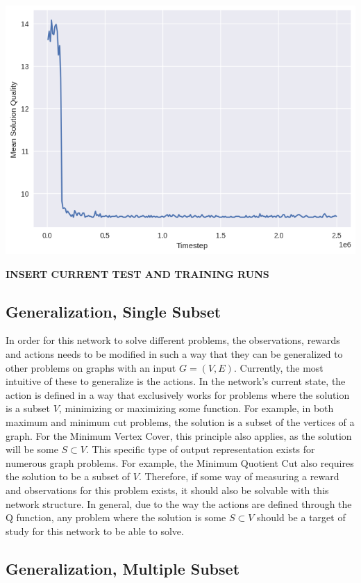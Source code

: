 \documentclass{article}
\begin{document}
\includegraphics[scale=0.5]{../ER_20spin/eco/min_cover/network/training_curve.png}

\textbf{INSERT CURRENT TEST AND TRAINING RUNS}

\subsection{Generalization, Single Subset}

In order for this network to solve different problems, the observations, rewards and actions needs to be modified in such a way that they can be generalized to other problems on graphs with an input $G = (V, E)$. Currently, the most intuitive of these to generalize is the actions. In the network's current state, the action is defined in a way that exclusively works for problems where the solution is a subset $V$, minimizing or maximizing some function. For example, in both maximum and minimum cut problems, the solution is a subset of the vertices of a graph. For the Minimum Vertex Cover, this principle also applies, as the solution will be some $S \subset V$. This specific type of output representation exists for numerous graph problems. For example, the Minimum Quotient Cut also requires the solution to be a subset of $V$. Therefore, if some way of measuring a reward and observations for this problem exists, it should also be solvable with this network structure. In general, due to the way the actions are defined through the Q function, any problem where the solution is some $S \subset V$ should be a target of study for this network to be able to solve. 

\subsection{Generalization, Multiple Subset}
\end{document}
